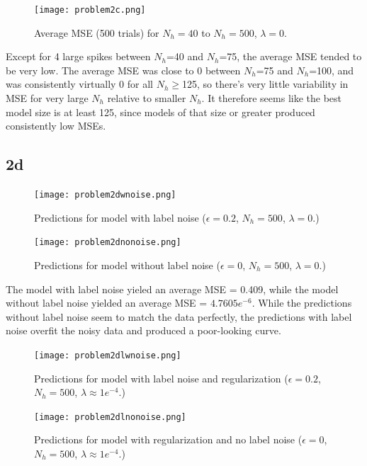 \documentclass[]{article}
\begin{document}
\begin{figure}[H]
    \centering
    \texttt{[image: problem2c.png]}
    \caption{Average MSE (500 trials) for $N_h=40$ to $N_h=500$, $\lambda=0.$}
    \label{fig:my_label}
\end{figure}

Except for 4 large spikes between $N_h$=40 and $N_h$=75, the average MSE tended to be very low. The average MSE was close to 0 between $N_h$=75 and $N_h$=100, and was consistently virtually 0 for all $N_h\geq$125, so there's very little variability in MSE for very large $N_h$ relative to smaller $N_h$. It therefore seems like the best model size is at least 125, since models of that size or greater produced consistently low MSEs.

\subsection*{2d}

\begin{figure}[H]
    \centering
    \texttt{[image: problem2dwnoise.png]}
    \caption{Predictions for model with label noise ($\epsilon=0.2$, $N_h=500$, $\lambda=0.$)}
    \label{fig:my_label}
\end{figure}

\begin{figure}[H]
    \centering
    \texttt{[image: problem2dnonoise.png]}
    \caption{Predictions for model without label noise ($\epsilon=0$, $N_h=500$, $\lambda=0.$)}
    \label{fig:my_label}
\end{figure}

The model with label noise yieled an average MSE = 0.409, while the model without label noise yielded an average MSE = $4.7605e^{-6}$. While the predictions without label noise seem to match the data perfectly, the predictions with label noise overfit the noisy data and produced a poor-looking curve.

\begin{figure}[H]
    \centering
    \texttt{[image: problem2dlwnoise.png]}
    \caption{Predictions for model with label noise and regularization ($\epsilon=0.2$, $N_h=500$, $\lambda\approx1e^{-4}.$)}
    \label{fig:my_label}
\end{figure}

\begin{figure}[H]
    \centering
    \texttt{[image: problem2dlnonoise.png]}
    \caption{Predictions for model with regularization and no label noise ($\epsilon=0$, $N_h=500$, $\lambda\approx1e^{-4}.$)}
    \label{fig:my_label}
\end{figure}
\end{document}

